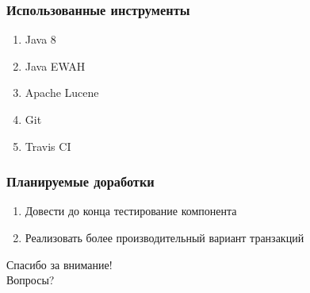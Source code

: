 \documentclass{beamer}
\begin{document}
\begin{frame}\frametitle{Использованные инструменты}
    \begin{enumerate}
        \item Java 8
        \item Java EWAH
        \item Apache Lucene
        \item Git 
        \item Travis CI
    \end{enumerate}
\end{frame}

\begin{frame}\frametitle{Планируемые доработки}
    \begin{enumerate}
        \item Довести до конца тестирование компонента 
        \item Реализовать более производительный вариант транзакций
    \end{enumerate}
\end{frame}

\begin{frame} 
    \begin{center} 
        \Huge Спасибо за внимание! \\ Вопросы? 
    \end{center} 
\end{frame} 
\end{document}
